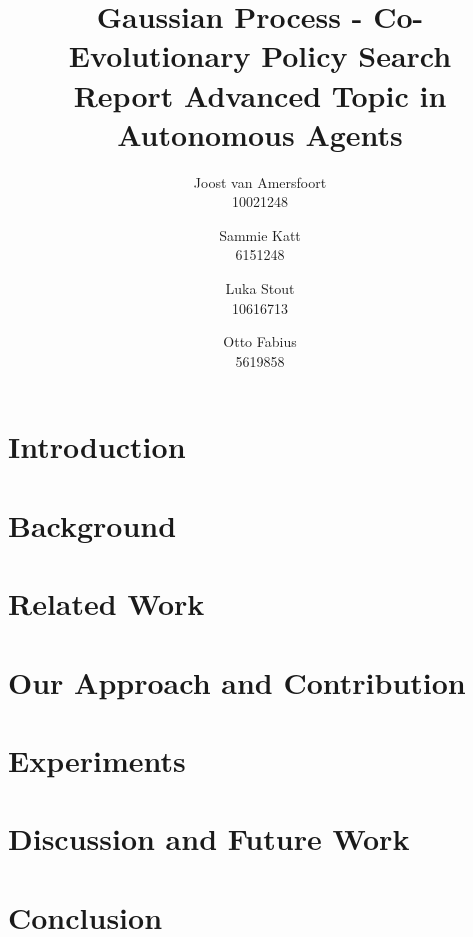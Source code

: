 \documentclass{article}
\title{Gaussian Process - Co-Evolutionary Policy Search \\ {\large Report Advanced Topic in Autonomous Agents}}
\author{Joost van Amersfoort \\ 10021248 \and Sammie Katt \\ 6151248 \and Luka Stout \\ 10616713 \and Otto Fabius \\ 5619858}
\begin{document}
\maketitle
\tableofcontents
\newpage

\section{Introduction}


\section{Background}\label{background}


\section{Related Work}\label{related}


\section{Our Approach and Contribution}\label{contrib}


\section{Experiments}\label{experiments}


\section{Discussion and Future Work}\label{discussion}


\section{Conclusion}\label{conclusion}


\pagebreak 
\nocite{*}


\end{document}
